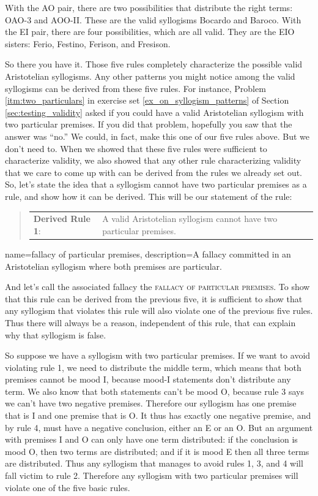 With the AO pair, there are two possibilities that distribute the right terms: OAO-3 and AOO-II. These are the valid syllogisms Bocardo and Baroco. With the EI pair, there are four possibilities, which are all valid. They are the EIO sisters: Ferio, Festino, Ferison, and Fresison. 

So there you have it. Those five rules completely characterize the possible valid Aristotelian syllogisms. Any other patterns you might notice among the valid syllogisms can be derived from these five rules. For instance, Problem \ref{itm:two_particulars} in exercise set \ref{ex_on_syllogism_patterns} of Section \ref{sec:testing_validity} asked if you could have a valid Aristotelian syllogism with two particular premises. If you did that problem, hopefully you saw that the answer was ``no.'' We could, in fact, make this one of our five rules above. But we don't need to. When we showed that these five rules were sufficient to characterize validity, we also showed that any other rule characterizing validity that we care to come up with can be derived from the rules we already set out. So, let's state the idea that a syllogism cannot have two particular premises as a rule, and show how it can be derived. This will be our statement of the rule:

 \begin{quotation}
\begin{tabu}{p{.25\linewidth}p{.75\linewidth}}
\textbf{Derived Rule 1}: &  A valid Aristotelian syllogism cannot have two particular premises. 
\end{tabu}\label{derived_rule_1}
\end{quotation}

{
name=fallacy of particular premises,
description={A fallacy committed in an Aristotelian syllogism where both premises are particular.}
}

And let's call the associated fallacy the \textsc{\gls{fallacy of particular premises}}. \label{def:particular_premises} To show that this rule can be derived from the previous five, it is sufficient to show that any syllogism that violates this rule will also violate one of the previous five rules. Thus there will always be a reason, independent of this rule, that can explain why that syllogism is false. 

So suppose we have a syllogism with two particular premises. If we want to avoid violating rule 1, we need to distribute the middle term, which means that both premises cannot be mood I, because mood-I statements don't distribute any term. We also know that both statements can't be mood O, because rule 3 says we can't have two negative premises. Therefore our syllogism has one premise that is I and one premise that is O. It thus has exactly one negative premise, and by rule 4, must have a negative conclusion, either an E or an O. But an argument with premises I and O can only have one term distributed: if the conclusion is mood O, then two terms are distributed; and if it is mood E then all three terms are distributed. Thus any syllogism that manages to avoid rules 1, 3, and 4 will fall victim to rule 2. Therefore any syllogism with two particular premises will violate one of the five basic rules. 

